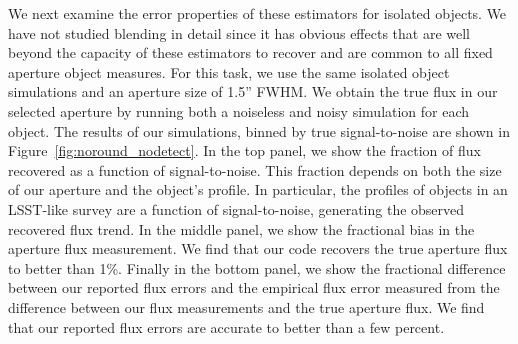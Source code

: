 \documentclass[twocolappendix, appendixfloats, numberedappendix, twocolumn, apj]{openjournal}
\begin{document}
We next examine the error properties of these estimators for isolated objects. We have not
studied blending in detail since it has obvious effects that are well beyond the capacity
of these estimators to recover and are common to all fixed aperture object measures. For this task,
we use the same isolated object simulations and an aperture size of 1.5'' FWHM. We obtain the
true flux in our selected aperture by running both a noiseless and noisy simulation for each
object. The results of our simulations, binned by true signal-to-noise are shown in
Figure~\ref{fig:noround_nodetect}. In the top panel, we show the fraction of flux recovered
as a function of signal-to-noise. This fraction depends on both the size of our aperture
and the object's profile. In particular, the profiles of objects in an LSST-like survey
are a function of signal-to-noise, generating the observed recovered flux trend. In the middle
panel, we show the fractional bias in the aperture flux measurement. We find that our code
recovers the true aperture flux to better than 1\%. Finally in the bottom panel, we show
the fractional difference between our reported flux errors and the empirical flux error
measured from the difference between our flux measurements and the true aperture flux. We
find that our reported flux errors are accurate to better than a few percent.
\end{document}
